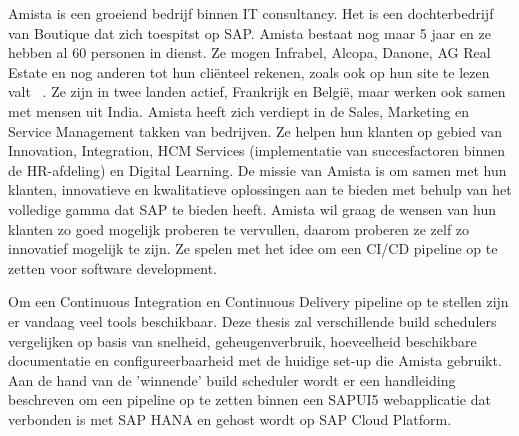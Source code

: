 Amista is een groeiend bedrijf binnen IT consultancy. Het is een dochterbedrijf van Boutique dat zich toespitst op SAP. Amista bestaat nog maar 5 jaar en ze hebben al 60 personen in dienst. Ze mogen Infrabel, Alcopa, Danone, AG Real Estate en nog anderen tot hun cliënteel rekenen, zoals ook op hun site te lezen valt ~\autocite{Amista2018}.
Ze zijn in twee landen actief, Frankrijk en België, maar werken ook samen met mensen uit India.
Amista heeft zich verdiept in de Sales, Marketing en Service Management takken van bedrijven. Ze helpen hun klanten op gebied van Innovation, Integration, HCM Services (implementatie van succesfactoren binnen de HR-afdeling) en Digital Learning.
De missie van Amista is om samen met hun klanten, innovatieve en kwalitatieve oplossingen aan te bieden met behulp van het volledige gamma dat SAP te bieden heeft.
Amista wil graag de wensen van hun klanten zo goed mogelijk proberen te vervullen, daarom proberen ze zelf zo innovatief mogelijk te zijn. Ze spelen met het idee om een CI/CD pipeline op te zetten voor software development.

Om een Continuous Integration en Continuous Delivery pipeline op te stellen zijn er vandaag veel tools beschikbaar.
Deze thesis zal verschillende build schedulers vergelijken op basis van snelheid, geheugenverbruik, hoeveelheid beschikbare documentatie en configureerbaarheid met de huidige set-up die Amista gebruikt.
Aan de hand van de 'winnende' build scheduler wordt er een handleiding beschreven om een pipeline op te zetten binnen een SAPUI5 webapplicatie dat verbonden is met SAP HANA en gehost wordt op SAP Cloud Platform.

%

